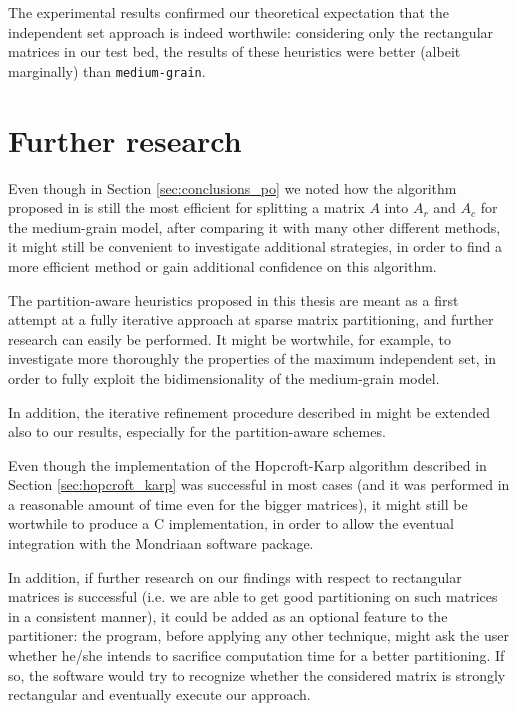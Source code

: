 The experimental results confirmed our theoretical expectation that the independent set approach is indeed worthwile: considering only the rectangular matrices in our test bed, the results of these heuristics were better (albeit marginally) than \verb|medium-grain|.

\section{Further research}

Even though in Section \ref{sec:conclusions_po} we noted how the algorithm proposed in \cite{mediumgrain} is still the most efficient for splitting a matrix $A$ into $A_r$ and $A_c$ for the medium-grain model, after comparing it with many other different methods, it might still be convenient to investigate additional strategies, in order to find a more efficient method or gain additional confidence on this algorithm.

The partition-aware heuristics proposed in this thesis are meant as a first attempt at a fully iterative approach at sparse matrix partitioning, and further research can easily be performed. It might be wortwhile, for example, to investigate more thoroughly the properties of the maximum independent set, in order to fully exploit the bidimensionality of the medium-grain model.

In addition, the iterative refinement procedure described in \cite{mediumgrain} might be extended also to our results, especially for the partition-aware schemes.

Even though the implementation of the Hopcroft-Karp algorithm described in Section \ref{sec:hopcroft_karp} was successful in most cases (and it was performed in a reasonable amount of time even for the bigger matrices), it might still be wortwhile to produce a C implementation, in order to allow the eventual integration with the Mondriaan software package. 

In addition, if further research on our findings with respect to rectangular matrices is successful (i.e. we are able to get good partitioning on such matrices in a consistent manner), it could be added as an optional feature to the partitioner: the program, before applying any other technique, might ask the user whether he/she intends to sacrifice computation time for a better partitioning. If so, the software would try to recognize whether the considered matrix is strongly rectangular and eventually execute our approach.
